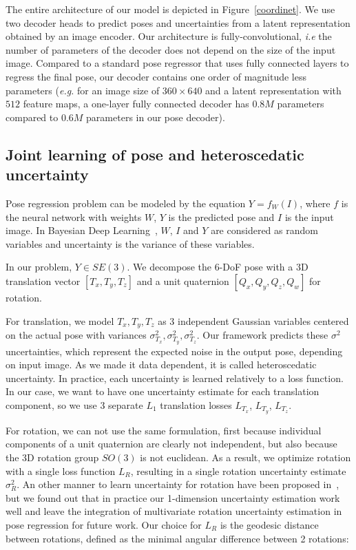 \documentclass[10pt,twocolumn,letterpaper]{article}
\begin{document}
The entire architecture of our model is depicted in Figure~\ref{coordinet}. We use two decoder heads to predict poses and uncertainties from a latent representation obtained by an image encoder. Our architecture is fully-convolutional, \textit{i.e} the number of parameters of the decoder does not depend on the size of the input image. Compared to a standard pose regressor that uses fully connected layers to regress the final pose, our decoder contains one order of magnitude less parameters (\textit{e.g.} for an image size of $360 \times 640$ and a latent representation with $512$ feature maps, a one-layer fully connected decoder has $0.8M$ parameters compared to $0.6M$ parameters in our pose decoder).



\subsection{Joint learning of pose and heteroscedatic uncertainty}
\label{jointlearning}

Pose regression problem can be modeled by the equation
$Y = f_W(I)$,
where $f$ is the neural network with weights $W$, $Y$ is the predicted pose and $I$ is the input image. In Bayesian Deep Learning~\cite{whatuncertainties}, $W$, $I$ and $Y$ are considered as random variables and uncertainty is the variance of these variables.

In our problem, $Y \in SE(3)$. We decompose the 6-DoF pose with a 3D translation vector $[T_{x},T_{y},T_{z}]$ and a unit quaternion $[Q_x,Q_y,Q_z,Q_w]$ for rotation.

For translation, we model $T_{x},T_{y},T_{z}$ as 3 independent Gaussian variables centered on the actual pose with variances $\sigma^2_{T_{x}},\sigma^2_{T_{y}},\sigma^2_{T_{z}}$. Our framework predicts these $\sigma^2$ uncertainties, which represent the expected noise in the output pose, depending on input image. As we made it data dependent, it is called heteroscedatic uncertainty. In practice, each uncertainty is learned relatively to a loss function. In our case, we want to have one uncertainty estimate for each translation component, so we use 3 separate $L_{1}$ translation losses $L_{T_x}$, $L_{T_y}$, $L_{T_z}$.

For rotation, we can not use the same formulation, first because individual components of a unit quaternion are clearly not independent, but also because the 3D rotation group $SO(3)$ is not euclidean. As a result, we optimize rotation with a single loss function $L_R$, resulting in a single rotation uncertainty estimate $\sigma^2_{R}$. An other manner to learn uncertainty for rotation have been proposed in~\cite{peretroukhin2019probabilistic}, but we found out that in practice our 1-dimension uncertainty estimation work well and leave the integration of multivariate rotation uncertainty estimation in pose regression for future work. Our choice for $L_R$ is the geodesic distance between rotations, defined as the minimal angular difference between 2 rotations:
\end{document}
